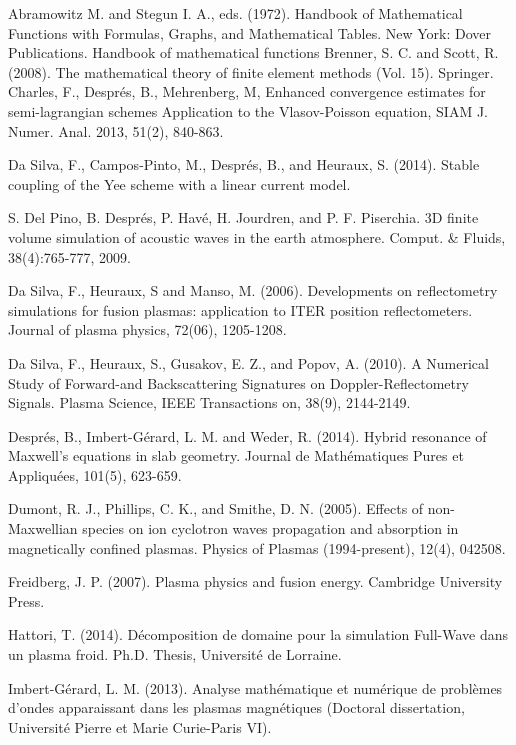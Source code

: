 \documentclass[proc]{edpsmath}
\begin{document}
\begin{thebibliography}{99}
	 Abramowitz M. and Stegun I. A., eds. (1972). Handbook of Mathematical Functions with Formulas, Graphs, and Mathematical Tables. New York: Dover Publications.
	Handbook of mathematical functions
	 Brenner, S. C. and Scott, R. (2008). The mathematical theory of finite element methods (Vol. 15). Springer.
Charles, F., Despr\'es, B., Mehrenberg, M, 
Enhanced convergence estimates for semi-lagrangian schemes Application to the Vlasov-Poisson equation, SIAM J. Numer. Anal. 2013, 51(2), 840-863.

 Da Silva, F., Campos-Pinto, M., Després, B., and Heuraux, S. (2014). Stable coupling of the Yee scheme with a linear current model.

S. Del Pino, B. Despr\'es, P. Hav\'e, H. Jourdren, and P. F. Piserchia. 3D finite
volume simulation of acoustic waves in the earth atmosphere.
Comput. \&
Fluids, 38(4):765-777, 2009.

 Da Silva, F., Heuraux, S and  Manso, M. (2006). Developments on reflectometry simulations for fusion plasmas: application to ITER position reflectometers. Journal of plasma physics, 72(06), 1205-1208.

Da Silva, F., Heuraux, S., Gusakov, E. Z., and Popov, A. (2010). A Numerical Study of Forward-and Backscattering Signatures on Doppler-Reflectometry Signals. Plasma Science, IEEE Transactions on, 38(9), 2144-2149.

 Després, B., Imbert-Gérard, L. M. and Weder, R. (2014). Hybrid resonance of Maxwell's equations in slab geometry. Journal de Mathématiques Pures et Appliquées, 101(5), 623-659.

 Dumont, R. J., Phillips, C. K., and Smithe, D. N. (2005). Effects of non-Maxwellian species on ion cyclotron waves propagation and absorption in magnetically confined plasmas. Physics of Plasmas (1994-present), 12(4), 042508.

 Freidberg, J. P. (2007). Plasma physics and fusion energy. Cambridge University Press.


Hattori, T. (2014).
D\'ecomposition de domaine pour la simulation Full-Wave dans un plasma froid.
Ph.D. Thesis, Universit\'e de
Lorraine.

 Imbert-Gérard, L. M. (2013). Analyse mathématique et numérique de problèmes d'ondes apparaissant dans les plasmas magnétiques (Doctoral dissertation, Université Pierre et Marie Curie-Paris VI).





\end{thebibliography}
\end{document}
